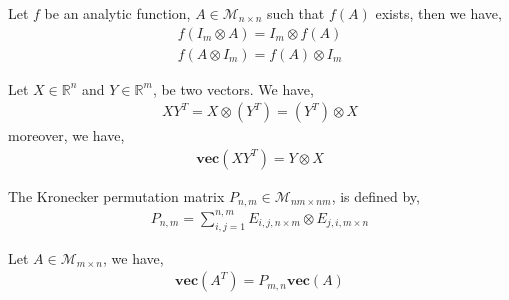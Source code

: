 \begin{proposition}
Let $f$ be an analytic function, $A \in \mathcal{M}_{n \times n}$ such that $f(A)$ exists, then we have,
\begin{align}
f(I_m \otimes A) = I_m \otimes f(A)
\\
f( A \otimes I_m ) = f(A) \otimes I_m 
\end{align}
\end{proposition}

\begin{proposition}
Let $X \in \mathbb{R}^{n}$ and $Y \in \mathbb{R}^{m}$, be two vectors. We have,
\begin{align}
X Y^T = X \otimes (Y^T) = (Y^T) \otimes X
\end{align}
moreover, we have,
\begin{align}
\mathbf{vec} (XY^T) = Y \otimes X 
\end{align}
\end{proposition}

\begin{definition}
The Kronecker permutation matrix $P_{n,m} \in  \mathcal{M}_{nm \times nm}$, is defined by,
\begin{align}
P_{n,m} = \sum_{i,j=1}^{n,m} E_{i,j,n \times m} \otimes E_{j,i,m \times n}
\end{align}
\end{definition}

\begin{proposition}
Let $A \in \mathcal{M}_{m \times n}$, we have,
\begin{align}
\mathbf{vec} (A^T) = P_{m,n} \mathbf{vec} (A) 
\end{align}
\end{proposition}

